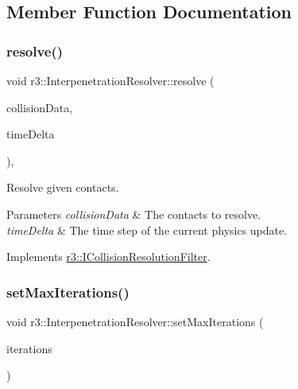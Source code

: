 \subsection{Member Function Documentation}
\mbox{\label{classr3_1_1_interpenetration_resolver_a7c896a7e8e0321c9f26b3d9c616d16ee}} 
\subsubsection{\texorpdfstring{resolve()}{resolve()}}
{\footnotesize\ttfamily void r3\+::\+Interpenetration\+Resolver\+::resolve (\begin{DoxyParamCaption}\item[{\mbox{\hyperlink{classr3_1_1_collision_data}{Collision\+Data}} \&}]{collision\+Data,  }\item[{\mbox{\hyperlink{namespacer3_ab2016b3e3f743fb735afce242f0dc1eb}{real}}}]{time\+Delta }\end{DoxyParamCaption})\hspace{0.3cm}{\ttfamily [override]}, {\ttfamily [virtual]}}



Resolve given contacts. 


\begin{DoxyParams}{Parameters}
{\em collision\+Data} & The contacts to resolve. \\
\hline
{\em time\+Delta} & The time step of the current physics update. \\
\hline
\end{DoxyParams}


Implements \mbox{\hyperlink{classr3_1_1_i_collision_resolution_filter_a87ef2579e2acaaadef4cd8f9a20005ce}{r3\+::\+I\+Collision\+Resolution\+Filter}}.

\mbox{\label{classr3_1_1_interpenetration_resolver_a8250baac4ce0ed634002ed3be4515519}} 
\subsubsection{\texorpdfstring{set\+Max\+Iterations()}{setMaxIterations()}}
{\footnotesize\ttfamily void r3\+::\+Interpenetration\+Resolver\+::set\+Max\+Iterations (\begin{DoxyParamCaption}\item[{unsigned int}]{iterations }\end{DoxyParamCaption})}

